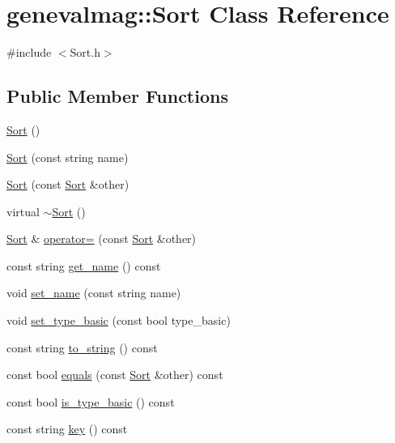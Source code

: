 \hypertarget{classgenevalmag_1_1Sort}{
\section{genevalmag::Sort Class Reference}
\label{classgenevalmag_1_1Sort}
}


{\ttfamily \#include $<$Sort.h$>$}

\subsection*{Public Member Functions}
\begin{DoxyCompactItemize}
\item 
\hyperlink{classgenevalmag_1_1Sort_ae16fdd544e5e88954b272d746014b34f}{Sort} ()
\item 
\hyperlink{classgenevalmag_1_1Sort_a741ce3c7c95b313f4a7d04588d2f32ec}{Sort} (const string name)
\item 
\hyperlink{classgenevalmag_1_1Sort_ab2cce40fbf624c23b0371c3a7f931ac4}{Sort} (const \hyperlink{classgenevalmag_1_1Sort}{Sort} \&other)
\item 
virtual \hyperlink{classgenevalmag_1_1Sort_a14a311f8129e51ee0005a3f694eeb56d}{$\sim$Sort} ()
\item 
\hyperlink{classgenevalmag_1_1Sort}{Sort} \& \hyperlink{classgenevalmag_1_1Sort_ac04dccc91f8c8bec5af9b86f9f3c7b7a}{operator=} (const \hyperlink{classgenevalmag_1_1Sort}{Sort} \&other)
\item 
const string \hyperlink{classgenevalmag_1_1Sort_a5bbccf82148fea12f958bd276a009fd4}{get\_\-name} () const 
\item 
void \hyperlink{classgenevalmag_1_1Sort_ab98ad164260650cae11a6a712d1808d5}{set\_\-name} (const string name)
\item 
void \hyperlink{classgenevalmag_1_1Sort_aef4090cc2961e5f9614d1db43386d485}{set\_\-type\_\-basic} (const bool type\_\-basic)
\item 
const string \hyperlink{classgenevalmag_1_1Sort_a669e4c331b862e2970738c3e9ad88749}{to\_\-string} () const 
\item 
const bool \hyperlink{classgenevalmag_1_1Sort_a81590adfe2e0c4703a0d93d2e34aa3d1}{equals} (const \hyperlink{classgenevalmag_1_1Sort}{Sort} \&other) const 
\item 
const bool \hyperlink{classgenevalmag_1_1Sort_ae6ede6f432ec5cc83a103efbd2493cf9}{is\_\-type\_\-basic} () const 
\item 
const string \hyperlink{classgenevalmag_1_1Sort_a68cc79c2d28feb6d24173adcfc4864ce}{key} () const 
\end{DoxyCompactItemize}
